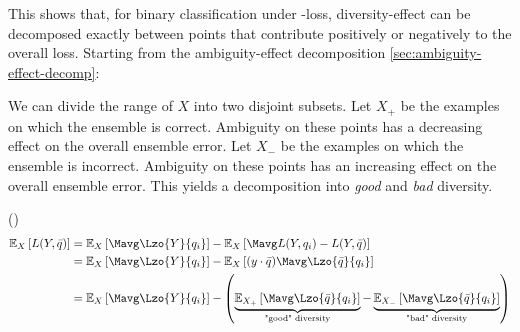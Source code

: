 \documentclass[../main.tex]{subfiles}
\begin{document}
This shows that, for binary classification under \zeroone-loss, diversity-effect can be decomposed exactly between points that contribute positively or negatively to the overall loss.
 Starting from the 
ambiguity-effect decomposition \ref{sec:ambiguity-effect-decomp}:

We can divide the range of $X$ into two disjoint subsets. Let $X_{+}$ be the examples on which the ensemble is correct. Ambiguity on these points has a decreasing effect on the overall ensemble error. Let $X_{-}$ be the examples on which the ensemble is incorrect. Ambiguity on these points has an increasing effect on the overall ensemble error. This yields a decomposition into \textit{good} and \textit{bad} diversity.

\begin{widepar}
\begin{corollary} (\cite{kuncheva})
\begin{align*}
\mathbb{E}_{X}\left[   L(Y, \bar{q}) \right] 
&= 
\mathbb{E}_{X}\left[    \Mavg \Lzo{Y}{q_{i}}  \right]
-
\mathbb{E}_{X}\left[   \Mavg L(Y, q_{i}) - L(Y, \bar{q}) \right] \\
&= 
\mathbb{E}_{X}\left[ \Mavg \Lzo{Y}{q_{i}} \right] - \mathbb{E}_{X}\left[ (y \cdot \bar{q}) \Mavg \Lzo{\bar{q}}{q_{i}} \right]  \\
&= 
\mathbb{E}_{X}\left[    \Mavg \Lzo{Y}{q_{i}}  \right]
- 
\left(
\underbrace{
\mathbb{E}_{X_{+}}\left[ \Mavg \Lzo{\bar{q}}{q_{i}} \right]  
}_{\text{"good" diversity}}
- 
\underbrace{
\mathbb{E}_{X_{-}}\left[ \Mavg \Lzo{\bar{q}}{q_{i}} \right] 
}_{\text{"bad" diversity}}
\right)
\end{align*}
\end{corollary}
\end{widepar}
\end{document}
